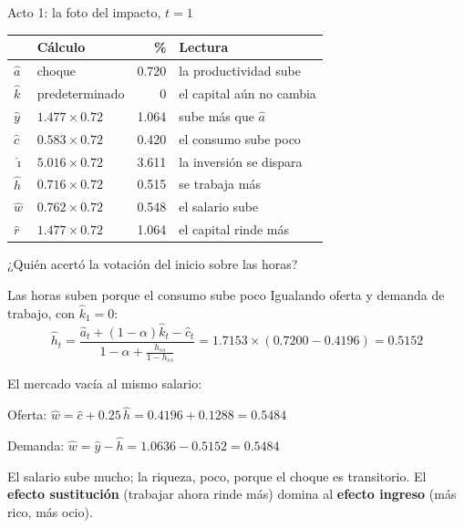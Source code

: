 \begin{frame}[label=acto1]{Acto 1: la foto del impacto, $t=1$}
  \centering\small
  \renewcommand{\arraystretch}{1.2}
  \begin{tabular}{@{}llrl@{}}
    \toprule
    & \textbf{Cálculo} & \textbf{\%} & \textbf{Lectura}\\
    \midrule
    $\hat a$ & choque & 0.720 & la productividad sube\\
    $\hat k$ & predeterminado & 0 & el capital aún no cambia\\
    $\hat y$ & $1.477\times0.72$ & 1.064 & sube más que $\hat a$\\
    $\hat c$ & $0.583\times0.72$ & 0.420 & el consumo sube poco\\
    $\hat\imath$ & $5.016\times0.72$ & \num{3.611} & la inversión se dispara\\
    $\hat h$ & $0.716\times0.72$ & 0.515 & se trabaja más\\
    $\hat w$ & $0.762\times0.72$ & 0.548 & el salario sube\\
    $\hat r$ & $1.477\times0.72$ & 1.064 & el capital rinde más\\
    \bottomrule
  \end{tabular}
  \par\vspace{0.3cm}\raggedright\normalsize
  ¿Quién acertó la votación del inicio sobre las horas?
\end{frame}

\begin{frame}[label=acto1-horas]{Las horas suben porque el consumo sube poco}
  Igualando oferta y demanda de trabajo, con $\hat k_1=0$:
  \[
  \hat h_t=\frac{\hat a_t+(1-\alpha)\hat k_t-\hat c_t}{1-\alpha+\frac{h_{ss}}{1-h_{ss}}}
  =1.7153\times(0.7200-0.4196)=\num{0.5152}
  \]
  \par\vspace{0.1cm}
  El mercado vacía al mismo salario:\par
  \vspace{0.1cm}
  \hspace*{0.4cm}Oferta: $\hat w=\hat c+0.25\,\hat h=0.4196+0.1288=0.5484$\par
  \hspace*{0.4cm}Demanda: $\hat w=\hat y-\hat h=1.0636-0.5152=0.5484$\par
  \vspace{0.3cm}
  El salario sube mucho; la riqueza, poco, porque el choque es transitorio. El
  \textbf{efecto sustitución} (trabajar ahora rinde más) domina al \textbf{efecto
  ingreso} (más rico, más ocio).
\end{frame}

